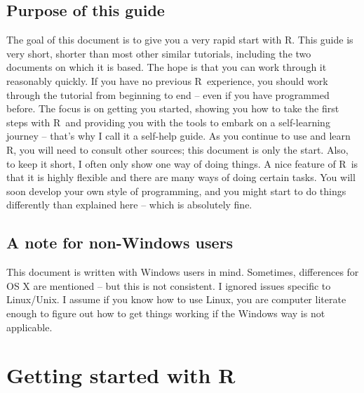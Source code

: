 \documentclass [11pt]{article}
\newcommand\R{{\sf R}}
\numberwithin{exercise}{section}
\begin{document}
\subsection{Purpose of this guide}
The goal of this document is to give you a very rapid start with \R. This guide is very short, shorter than most other similar tutorials, including the two documents on which it is based. The hope is that you can work through it reasonably quickly. If you have no previous \R\ experience, you should work through the tutorial from beginning to end -- even if you have programmed before. The focus is on getting you started, showing you how to take the first steps with \R\ and providing you with the tools to embark on a self-learning journey -- that's why I call it a self-help guide. As you continue to use and learn \R, you will need to consult other sources; this document is only the start. Also, to keep it short, I often only show one way of doing things. A nice feature of \R\ is that it is highly flexible and there are many ways of doing certain tasks. You will soon develop your own style of programming, and you might start to do things differently than explained here -- which is absolutely fine.


\subsection{A note for non-Windows users}
This document is written with Windows users in mind. Sometimes, differences for OS X are mentioned -- but this is not consistent. I ignored issues specific to Linux/Unix. I assume if you know how to use Linux, you are computer literate enough to figure out how to get things working if the Windows way is not applicable. 


\section{Getting started with \R}

\end{document}
